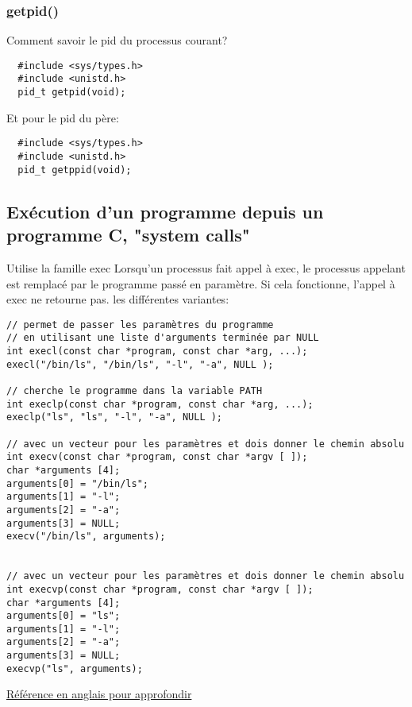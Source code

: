 \documentclass[a4paper]{article}
\begin{document}
\subsubsection{getpid()}
Comment savoir le pid du processus courant?
\begin{lstlisting}
  #include <sys/types.h>
  #include <unistd.h>
  pid_t getpid(void);
\end{lstlisting}
Et pour le pid du père:
\begin{lstlisting}
  #include <sys/types.h>
  #include <unistd.h>
  pid_t getppid(void);
\end{lstlisting}
\subsection{Exécution d'un programme depuis un programme C, "system calls"}
Utilise la famille exec\newline
Lorsqu'un processus fait appel à exec, le processus appelant est remplacé par le programme passé en paramètre. Si cela fonctionne, l'appel à exec ne retourne pas.\newline
les différentes variantes:
\begin{lstlisting}
// permet de passer les paramètres du programme
// en utilisant une liste d'arguments terminée par NULL
int execl(const char *program, const char *arg, ...);
execl("/bin/ls", "/bin/ls", "-l", "-a", NULL );

// cherche le programme dans la variable PATH
int execlp(const char *program, const char *arg, ...);
execlp("ls", "ls", "-l", "-a", NULL );

// avec un vecteur pour les paramètres et dois donner le chemin absolu
int execv(const char *program, const char *argv [ ]);
char *arguments [4];
arguments[0] = "/bin/ls";
arguments[1] = "-l";
arguments[2] = "-a";
arguments[3] = NULL;
execv("/bin/ls", arguments);


// avec un vecteur pour les paramètres et dois donner le chemin absolu
int execvp(const char *program, const char *argv [ ]);
char *arguments [4];
arguments[0] = "ls";
arguments[1] = "-l";
arguments[2] = "-a";
arguments[3] = NULL;
execvp("ls", arguments);
\end{lstlisting}
\href{http://pubs.opengroup.org/onlinepubs/9699919799/functions/exec.html}{Référence en anglais pour approfondir}
\end{document}

